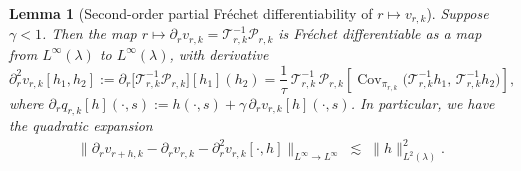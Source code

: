 \documentclass[11pt]{article}
\theoremstyle{plain}
\newtheorem{lemma}[theorem]{Lemma}
\begin{document}
\newpage 

\newpage 

 
\begin{lemma}[Second-order partial Fréchet differentiability of $r \mapsto v_{r,k}$]
\label{lemma::valuederivsecond}
Suppose $\gamma < 1$. 
Then the map $r \mapsto \partial_r v_{r,k} = \mathcal{T}_{r,k}^{-1}\mathcal{P}_{r,k}$
is Fréchet differentiable as a map from $L^\infty(\lambda)$ to $L^\infty(\lambda)$, with derivative
\[
\partial_r^2 v_{r,k}[h_1,h_2] := \partial_r\!\big[\mathcal{T}_{r,k}^{-1}\mathcal{P}_{r,k}\big][h_1](h_2)
= \frac{1}{\tau}\,\mathcal{T}_{r,k}^{-1}\,\mathcal{P}_{r,k}\!\left[
\operatorname{Cov}_{\pi_{r,k}}\!\Big(\mathcal{T}_{r,k}^{-1}h_1,\, \mathcal{T}_{r,k}^{-1}h_2
\Big)\right],
\]
where $\partial_r q_{r,k}[h](\cdot,s) := h(\cdot,s) + \gamma\,\partial_r v_{r,k}[h](\cdot,s)$. 
In particular, we have the quadratic expansion
\begin{align*}
 \|\partial_{r} v_{r+h,k} - \partial_{r} v_{r,k} - \partial_r^2 v_{r,k}[\cdot, h]\|_{L^\infty \to L^\infty} \;\lesssim\; \|h\|_{L^2(\lambda)}^2 .
\end{align*}
\end{lemma}
\end{document}

